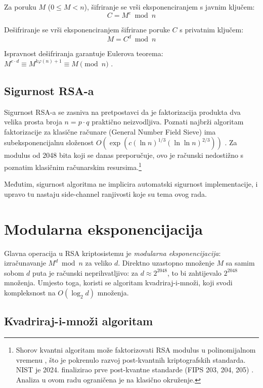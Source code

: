Za poruku $M$ ($0 \leq M < n$), šifriranje se vrši eksponenciranjem s javnim ključem:
\begin{equation}
C = M^e \bmod n
\label{eq:encrypt}
\end{equation}

Dešifriranje se vrši eksponenciranjem šifrirane poruke $C$ s privatnim ključem:
\begin{equation}
M = C^d \bmod n
\label{eq:decrypt}
\end{equation}

Ispravnost dešifriranja garantuje Eulerova teorema: $M^{e \cdot d} \equiv M^{k\varphi(n)+1} \equiv M \pmod{n}$ \cite{rivest1978}.

\subsection{Sigurnost RSA-a}

Sigurnost RSA-a se zasniva na pretpostavci da je faktorizacija produkta dva velika prosta broja $n = p \cdot q$ praktično neizvodljiva. Poznati najbrži algoritam faktorizacije za klasične računare (General Number Field Sieve) ima subeksponencijalnu složenost $O(\exp(c(\ln n)^{1/3}(\ln \ln n)^{2/3}))$ \cite{lenstra1993}. Za modulus od 2048 bita koji se danas preporučuje, ovo je računski nedostižno s poznatim klasičnim računarskim resursima.\footnote{Shorov kvantni algoritam može faktorizovati RSA modulus u polinomijalnom vremenu \cite{shor1994}, što je pokrenulo razvoj post-kvantnih kriptografskih standarda. NIST je 2024. finalizirao prve post-kvantne standarde (FIPS 203, 204, 205) \cite{nist_pqc2024}. Analiza u ovom radu ograničena je na klasično okruženje.}

Međutim, sigurnost algoritma ne implicira automatski sigurnost implementacije, i upravo tu nastaju side-channel ranjivosti koje su tema ovog rada.

\section{Modularna eksponencijacija}

Glavna operacija u RSA kriptosistemu je \textit{modularna eksponencijacija}: izračunavanje $M^d \bmod n$ za veliko $d$. Direktno uzastopno množenje $M$ sa samim sobom $d$ puta je računski neprihvatljivo: za $d \approx 2^{2048}$, to bi zahtijevalo $2^{2048}$ množenja. Umjesto toga, koristi se algoritam kvadriraj-i-množi, koji svodi kompleksnost na $O(\log_2 d)$ množenja.

\subsection{Kvadriraj-i-množi algoritam}

